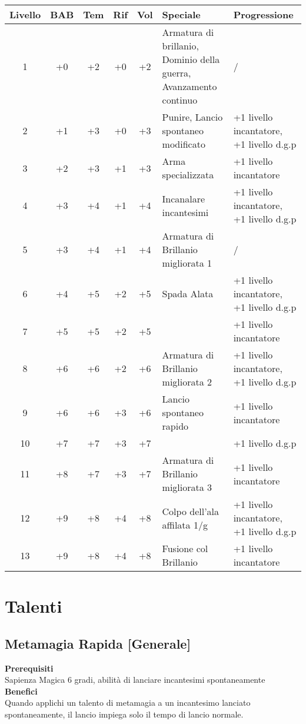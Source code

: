 \documentclass[a4paper]{report}
\begin{document}
\hspace{-1.25cm}
\begin{tabular}{|c|c|c|c|c|p{6cm}|p{6cm}|}
\hline
\textbf{Livello} & \textbf{BAB} & \textbf{Tem} & \textbf{Rif} & \textbf{Vol} & \textbf{Speciale} & \textbf{Progressione} \\ 
\hline
1  & +0 & +2 & +0 & +2 & Armatura di brillanio, Dominio della guerra, Avanzamento continuo & / \\ 
\hline
2  & +1 & +3 & +0 & +3 & Punire, Lancio spontaneo modificato & +1 livello incantatore, +1 livello d.g.p\\ 
\hline
3  & +2 & +3 & +1 & +3 & Arma specializzata & +1 livello incantatore \\ 
\hline
4  & +3 & +4 & +1 & +4 & Incanalare incantesimi & +1 livello incantatore, +1 livello d.g.p\\ 
\hline
5  & +3 & +4 & +1 & +4 & Armatura di Brillanio migliorata 1 & / \\ 
\hline
6  & +4 & +5 & +2 & +5 & Spada Alata & +1 livello incantatore, +1 livello d.g.p \\ 
\hline
7  & +5 & +5 & +2 & +5 &   & +1 livello incantatore \\ 
\hline
8  & +6 & +6 & +2 & +6 & Armatura di Brillanio migliorata 2 & +1 livello incantatore, +1 livello d.g.p \\ 
\hline
9  & +6 & +6 & +3 & +6 & Lancio spontaneo rapido & +1 livello incantatore \\ 
\hline
10 & +7 & +7 & +3 & +7 &   & +1 livello d.g.p \\ 
\hline
11 & +8 & +7 & +3 & +7 & Armatura di Brillanio migliorata 3 & +1 livello incantatore \\ 
\hline
12 & +9 & +8 & +4 & +8 & Colpo dell’ala affilata 1/g & +1 livello incantatore, +1 livello d.g.p \\ 
\hline
13 & +9 & +8 & +4 & +8 & Fusione col Brillanio & +1 livello incantatore \\ 
\hline
\end{tabular}

\chapter{Talenti}

\section{Metamagia Rapida [Generale]}
\label{rapidmetamagic}
\textbf{Prerequisiti}\\
Sapienza Magica 6 gradi, abilità di lanciare incantesimi spontaneamente\\
\textbf{Benefici}\\
Quando applichi un talento di metamagia a un incantesimo lanciato spontaneamente, il lancio impiega solo il tempo di lancio normale.
\end{document}
